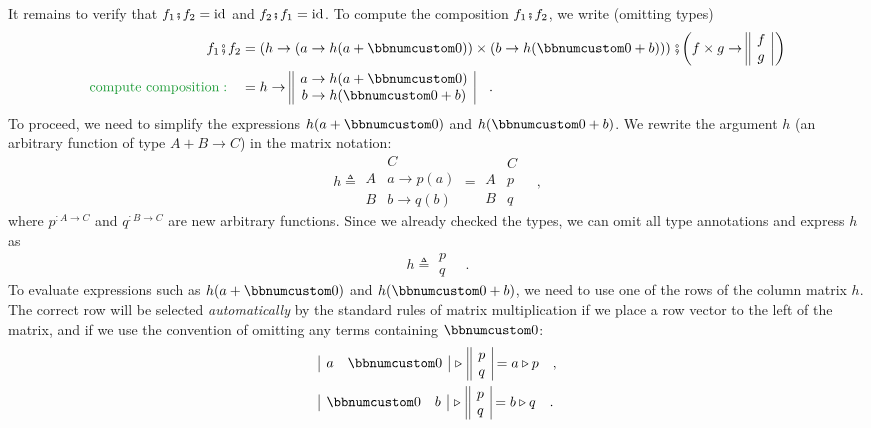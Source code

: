 It remains to verify that $f_{1}\bef f_{2}=\text{id}$ and $f_{2}\bef f_{1}=\text{id}$.
To compute the composition $f_{1}\bef f_{2}$, we write (omitting
types)
\begin{align*}
f_{1}\bef f_{2} & =\left(h\rightarrow(a\rightarrow h(a+\bbnum 0))\times(b\rightarrow h(\bbnum 0+b))\right)\bef\bigg(f\times g\rightarrow\begin{array}{||c|}
f\\
g
\end{array}\,\bigg)\\
{\color{greenunder}\text{compute composition}:}\quad & =h\rightarrow\begin{array}{||c|}
a\rightarrow h(a+\bbnum 0)\\
b\rightarrow h(\bbnum 0+b)
\end{array}\quad.
\end{align*}
To proceed, we need to simplify the expressions $h(a+\bbnum 0)$ and
$h(\bbnum 0+b)$. We rewrite the argument $h$ (an arbitrary function
of type $A+B\rightarrow C$) in the matrix notation:
\[
h\triangleq\begin{array}{|c||c|}
 & C\\
\hline A & a\rightarrow p(a)\\
B & b\rightarrow q(b)
\end{array}=\begin{array}{|c||c|}
 & C\\
\hline A & p\\
B & q
\end{array}\quad,
\]
where $p^{:A\rightarrow C}$ and $q^{:B\rightarrow C}$ are new arbitrary
functions. Since we already checked the types, we can omit all type
annotations and express $h$ as
\[
h\triangleq\begin{array}{||c|}
p\\
q
\end{array}\quad.
\]
To evaluate expressions such as $h(a+\bbnum 0)$ and $h(\bbnum 0+b)$,
we need to use one of the rows of the column matrix $h$. The correct
row will be selected \emph{automatically} by the standard rules of
matrix multiplication if we place a row vector to the left of the
matrix, and if we use the convention of omitting any terms containing
$\bbnum 0$:
\begin{align*}
 & \begin{array}{|cc|}
a & \bbnum 0\end{array}\,\triangleright\,\begin{array}{||c|}
p\\
q
\end{array}=a\triangleright p\quad,\\
 & \begin{array}{|cc|}
\bbnum 0 & b\end{array}\,\triangleright\,\begin{array}{||c|}
p\\
q
\end{array}=b\triangleright q\quad.
\end{align*}
